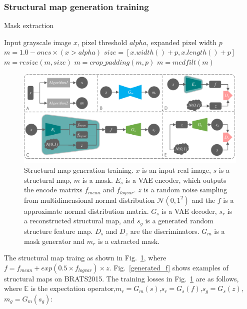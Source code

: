 \documentclass[runningheads]{llncs}
\begin{document}
	\subsubsection{Structural map generation training}
	\begin{algorithm}
		\caption{Mask extraction}
		\label{alg:2}
		\begin{multicols}{2}
			\begin{algorithmic}[1]
				\State Input grayscale image $x$,  pixel threshold $alpha$, expanded pixel width $p$
				\State $m = 1.0 - ones \times (x > alpha)$
				\State $size=[x.width()+p, x.length()+p]$
				\State $m = resize(m, size)$
				\State $m = crop\_padding(m,p)$
				\State $m = medfilt(m)$
			\end{algorithmic}  
		\end{multicols}
	\end{algorithm}
	\begin{figure}
		\centering
		\includegraphics[width=0.98\columnwidth]{figures/feature_train}
		\caption{Structural map generation training. $x$ is an input real image, $s$ is a structural map, $m$ is a mask. $E_s$ is a VAE encoder, which outputs the encode matrixs $f_{mean}$ and $f_{logvar}$. $z$ is a random noise sampling from multidimensional normal distribution $\mathcal{N}(0,1^2)$ and the $f$ is a approximate normal distribution matrix. $G_s$ is a VAE decoder, $s_r$ is a reconstructed structural map, and $s_g$ is a generated random structure feature map. $D_{s}$ and $D_{z}$ are the discriminators. $G_m$ is a mask generator and $m_r$ is a extracted mask. }
		\label{feature_train}
	\end{figure}
	The structural map traing as shown in Fig.~\ref{feature_train}, where $f=f_{mean}+exp(0.5\times f_{logvar})\times z$. Fig.~\ref{generated_f} shows examples of structural maps on BRATS2015. The training losses in Fig.~\ref{feature_train} are as follows, where $\mathbb{E}$ is the expectation operator,$m_r=G_m(s)$,$s_r=G_s(f)$,$s_g=G_s(z)$,$m_g=G_m(s_g)$: 
\end{document}
